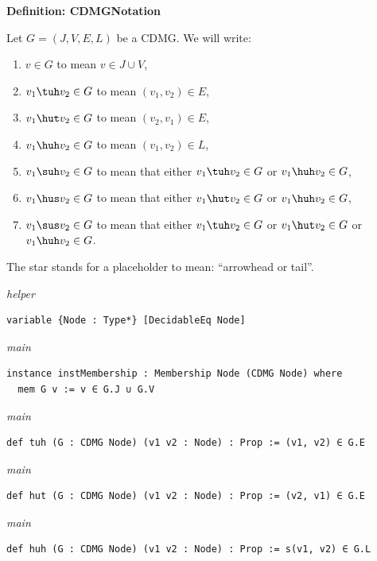 \vspace{\appendixNotesGap}

\noindent\textbf{Definition: CDMGNotation}\par\smallskip
{\appendixTexSize
    \label{not-cdmg}
    Let $G=(J,V,E,L)$ be a CDMG.
    We will write:
    \begin{enumerate}
        \item $v \in G$ to mean $v \in J \cup V$,
        \item $v_1 \tuh v_2 \in G$ to mean $(v_1,v_2) \in E$,
        \item $v_1 \hut v_2 \in G$ to mean $(v_2,v_1) \in E$,
        \item $v_1 \huh v_2 \in G$ to mean $(v_1,v_2) \in L$,
        \item $v_1 \suh v_2 \in G$ to mean that either $v_1 \tuh v_2 \in G$ or $v_1 \huh v_2 \in G$,
        \item $v_1 \hus v_2 \in G$ to mean that either $v_1 \hut v_2 \in G$ or $v_1 \huh v_2 \in G$,
        \item $v_1 \sus v_2 \in G$ to mean that either $v_1 \tuh v_2 \in G$ or $v_1 \hut v_2 \in G$ or $v_1 \huh v_2 \in G$.
    \end{enumerate}
    The star stands for a placeholder to mean: ``arrowhead or tail''.
\par}
\smallskip
{\small\textit{helper}}
\begin{verbatim}
variable {Node : Type*} [DecidableEq Node]
\end{verbatim}
{\small\textit{main}}
\begin{verbatim}
instance instMembership : Membership Node (CDMG Node) where
  mem G v := v ∈ G.J ∪ G.V
\end{verbatim}
{\small\textit{main}}
\begin{verbatim}
def tuh (G : CDMG Node) (v1 v2 : Node) : Prop := (v1, v2) ∈ G.E
\end{verbatim}
{\small\textit{main}}
\begin{verbatim}
def hut (G : CDMG Node) (v1 v2 : Node) : Prop := (v2, v1) ∈ G.E
\end{verbatim}
{\small\textit{main}}
\begin{verbatim}
def huh (G : CDMG Node) (v1 v2 : Node) : Prop := s(v1, v2) ∈ G.L
\end{verbatim}
